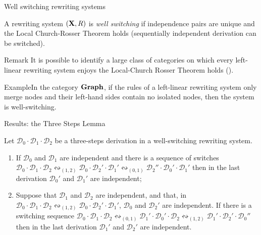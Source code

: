 \documentclass[usenames,dvipsnames]{beamer}
\newcommand{\shift}[1]{\ensuremath{\mathrel{{\leftrightsquigarrow}_{#1}}}}
\newcommand{\dder}[1]{\mathscr{#1}}
\newcommand{\catname}[1]{{\normalfont\textbf{#1}}}
\def\X{\textbf {\textup{X}}}
\begin{document}
\begin{frame}{Well switching rewriting systems}\justifying


\begin{definition}
A rewriting system $(\X, R)$ is \emph{well switching} if independence pairs are unique and the Local Church-Rosser Theorem holds (sequentially independent derivation can be switched).
\end{definition}
\pause 
\begin{block}{Remark}
	It is possible to identify a large class of categories on which every left-linear rewriting system enjoys the Local-Church Rosser Theorem holds (\cite{baldan2011adhesivity}).
\end{block}
\pause 
\begin{block}{Example}In the category $\catname{Graph}$, if the rules of a left-linear rewriting system only merge nodes and their left-hand sides contain no isolated nodes, then the system is well-switching.
\end{block}

\end{frame}

\begin{frame}{Results: the Three Steps Lemma}\justifying

\begin{lemma}  Let
	$\dder{D}_0\cdot \dder{D}_1 \cdot \dder{D}_2$ be a three-steps
	derivation in a well-switching rewriting system. 
	\begin{enumerate}\justifying
		\item
		If $\dder{D}_0$ and $\dder{D}_1$ are independent and there is a
		 sequence of switches
		$\dder{D}_0\cdot \dder{D}_1 \cdot \dder{D}_2 \shift{(1,2)}
		\dder{D}_0 \cdot \dder{D}_2' \cdot \dder{D}_1' \shift{(0,1)}
		\dder{D}_2'' \cdot \dder{D}_0' \cdot \dder{D}_1'$ then
		in the last derivation $\dder{D}_0'$ and $\dder{D}_1'$ are independent;
		
		\item
		\label{lem:indep-global-left:2}
		Suppose that $\dder{D}_1$ and $\dder{D}_2$ are independent, and that, in $\dder{D}_0\cdot \dder{D}_1 \cdot \dder{D}_2 \shift{(1,2)}
		\dder{D}_0 \cdot \dder{D}_2' \cdot \dder{D}_1'$, $\dder{D}_0$ and $\dder{D}_2'$ are independent.  If there
		is a switching sequence
		$\dder{D}_0\cdot \dder{D}_1 \cdot \dder{D}_2 \shift{(0,1)}
		\dder{D}_1' \cdot \dder{D}_0' \cdot \dder{D}_2 \shift{(1,2)}
		\dder{D}_1' \cdot \dder{D}_2' \cdot \dder{D}_0''$ then in the last derivation $\dder{D}_1'$ and $\dder{D}_2'$ are independent.
	\end{enumerate}
\end{lemma}
\end{frame}
\end{document}
